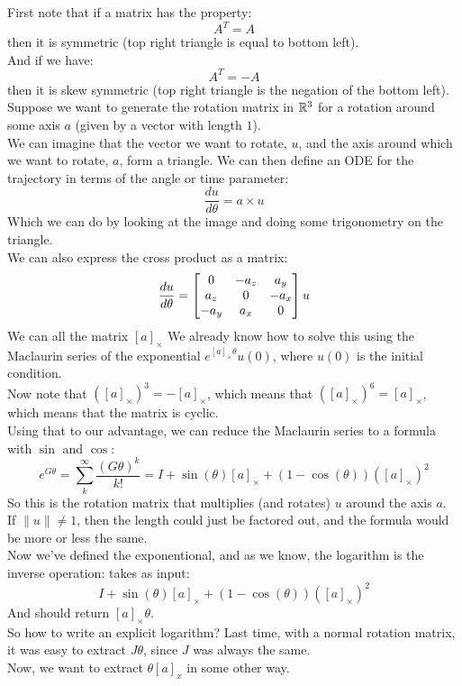 \documentclass[12pt]{article}
\begin{document}
First note that if a matrix has the property:
\[ A^T = A \]
then it is symmetric (top right triangle
is equal to bottom left). \\
And if we have:
\[ A^T = -A \]
then it is skew symmetric (top right triangle
is the negation of the bottom left). \\

Suppose we want to generate the rotation
matrix in $\mathbb{R}^3$ for a rotation around some
axis $a$ (given by a vector with length $1$). \\

We can imagine that the vector we want to rotate,
$u$, and the axis around which we want
to rotate, $a$,
form a triangle.
We can then define an ODE for the trajectory
in terms of the angle or time parameter:
\[ \dfrac{du}{d\theta} = a \times u \]
Which we can do by looking at the image
and doing some trigonometry on the triangle. \\
We can also express the cross product as a matrix:
\[ \dfrac{du}{d\theta} = 
\begin{bmatrix} 0 & -a_z & a_y \\ a_z & 0 & -a_x \\ -a_y & a_x & 0 \end{bmatrix}
u \]
We can all the matrix $[a]_\times$
We already know how to solve this using the
Maclaurin series of the exponential 
$e^{[a]_\times\theta}u(0)$,
where $u(0)$ is the initial condition. \\

Now note that $([a]_\times)^3 = -[a]_\times$,
which means that $([a]_\times)^6 = [a]_\times$,
which means that the matrix is cyclic. \\
Using that to our advantage,
we can reduce the Maclaurin series to
a formula with $\sin$ and $\cos$:
\[ e^{G\theta} = \sum_k^{\infty} 
\dfrac{(G\theta)^k}{k!}
= I + \sin(\theta)[a]_\times 
+ (1-\cos(\theta))([a]_\times)^2 \]
So this is the rotation matrix
that multiplies (and rotates) $u$
around the axis $a$. \\

If $\|u\| \neq 1$, then the length
could just be factored out,
and the formula would be more or less
the same. \\ 

Now we've defined the exponentional,
and as we know, the logarithm is the inverse
operation: takes as input:
\[ I + \sin(\theta)[a]_\times 
+ (1-\cos(\theta))([a]_\times)^2 \]
And should return $[a]_\times\theta$. \\

So how to write an explicit logarithm?
Last time, with a normal rotation matrix,
it was easy to extract $J\theta$,
since $J$ was always the same. \\
Now, we want to extract $\theta[a]_x$
in some other way. \\
\end{document}
